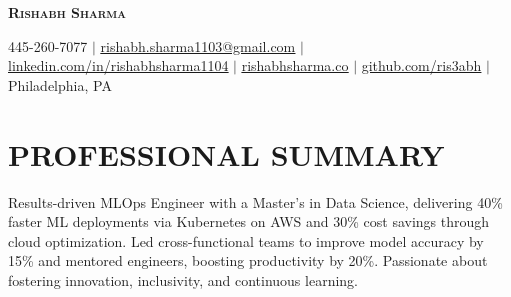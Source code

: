 \documentclass[letterpaper,10pt]{article}
\begin{document}
\begin{center}
    \textbf{\Huge \scshape Rishabh Sharma}
\end{center}
\begin{center}
    \small
    445-260-7077 $|$
    \href{mailto:rishabh.sharma1103@gmail.com}{\underline{rishabh.sharma1103@gmail.com}} $|$
    \href{https://www.linkedin.com/in/rishabhsharma1104/}{\underline{linkedin.com/in/rishabhsharma1104}} $|$
    \href{https://www.rishabhsharma.co/}{\underline{rishabhsharma.co}} $|$
    \href{https://github.com/ris3abh}{\underline{github.com/ris3abh}} $|$
    Philadelphia, PA
\end{center}

\section{PROFESSIONAL SUMMARY}  
Results-driven MLOps Engineer with a Master’s in Data Science, delivering 40\% faster ML deployments via Kubernetes on AWS and 30\% cost savings through cloud optimization. Led cross-functional teams to improve model accuracy by 15\% and mentored engineers, boosting productivity by 20\%. Passionate about fostering innovation, inclusivity, and continuous learning.

\end{document}
